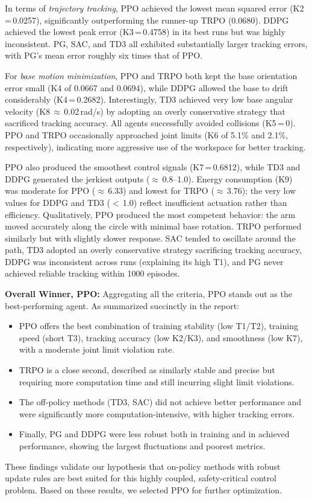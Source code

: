 \documentclass{ieeeaccess}
\begin{document}
In terms of \emph{trajectory tracking}, PPO achieved the lowest mean squared error (K2\,=\,0.0257), significantly 
outperforming the runner-up TRPO (0.0680). DDPG achieved the lowest peak error (K3\,=\,0.4758) in its best runs 
but was highly inconsistent. PG, SAC, and TD3 all exhibited substantially larger tracking errors, with PG's mean error roughly six times that of PPO.

For \emph{base motion minimization}, PPO and TRPO both kept the base orientation error small (K4 of 0.0667 and 0.0694), 
while DDPG allowed the base to drift considerably (K4\,=\,0.2682). Interestingly, TD3 achieved very low base angular velocity (K8\,$\approx$\,0.02\,rad/s) 
by adopting an overly conservative strategy that sacrificed tracking accuracy. All agents successfully avoided collisions (K5\,=\,0). 
PPO and TRPO occasionally approached joint limits (K6 of 5.1\% and 2.1\%, respectively), indicating more aggressive use of the workspace for better tracking.

PPO also produced the smoothest control signals (K7\,=\,0.6812), while TD3 and DDPG generated the jerkiest outputs ($\approx$\,0.8--1.0). 
Energy consumption (K9) was moderate for PPO ($\approx$\,6.33) and lowest for TRPO ($\approx$\,3.76); the very low values for DDPG and TD3 ($<$\,1.0) 
reflect insufficient actuation rather than efficiency.
Qualitatively, PPO produced the most competent behavior: the arm moved accurately along the circle with minimal base rotation. 
TRPO performed similarly but with slightly slower response. SAC tended to oscillate around the path, TD3 adopted an overly conservative 
strategy sacrificing tracking accuracy, DDPG was inconsistent across runs (explaining its high T1), and PG never achieved reliable tracking within 1000 episodes.

\textbf{Overall Winner, PPO:} Aggregating all the criteria, PPO stands out as the best-performing agent. As
summarized succinctly in the report:
\begin{itemize}
	\item PPO offers the best combination of training stability (low T1/T2),
	training speed (short T3), tracking accuracy (low K2/K3), and smoothness (low K7), with a moderate joint limit
	violation rate.
	\item  TRPO is a close second, described as similarly stable and precise but requiring more
	computation time and still incurring slight limit violations.
	\item The off-policy methods (TD3, SAC) did not
	achieve better performance and were significantly more computation-intensive, with higher tracking
	errors.
	\item Finally, PG and DDPG were less robust both in training and in achieved performance, showing
	the largest fluctuations and poorest metrics.
\end{itemize}
These findings validate our hypothesis that on-policy methods with 
robust update rules are best suited for this highly coupled, safety-critical control problem. 
Based on these results, we selected PPO for further optimization.
\end{document}
